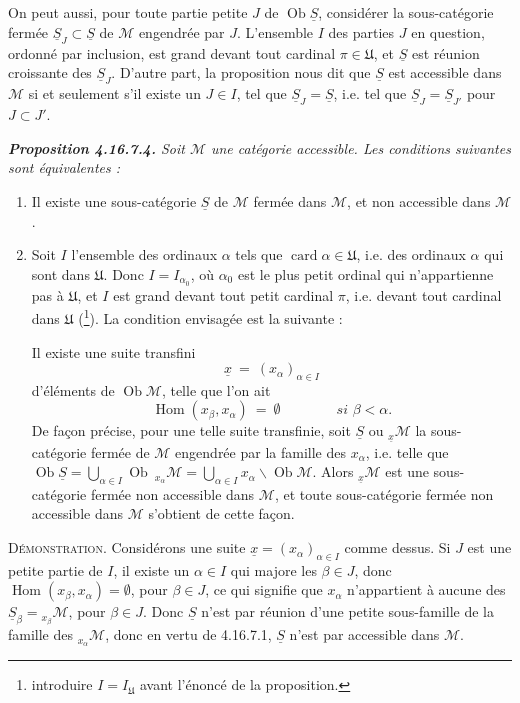 \documentclass[11pt]{article}
\newcommand{\printedpage}[1]{\marginpar{\footnotesize p.~#1}}
\newcommand{\msp}[1]{\marginpar{\footnotesize [#1]}}
\newcommand{\Ob}{\operatorname{Ob}}
\newcommand{\Hom}{\operatorname{Hom}}
\newcommand{\card}{\operatorname{card}}
\newcommand{\cM}{\mathcal{M}}
\newcommand{\uS}{\underline{S}}
\newcommand{\U}{\mathfrak{U}}
\begin{document}
\printedpage{186}

On peut aussi, pour toute partie petite $J$ de $\Ob \uS$, considérer la sous-catégorie fermée $\uS_J \subset \uS$ de $\cM$ engendrée par $J$. L'ensemble $I$ des parties $J$ en question, ordonné par inclusion, est grand devant tout cardinal $\pi \in \U$, et $\uS$ est réunion croissante des $\uS_J$. D'autre part, la proposition nous dit que $\uS$ est accessible dans $\cM$ si et seulement s'il existe un $J \in I$, tel que $\uS_J = \uS$, i.e. tel que $\uS_J = \uS_{J'}$ pour $J \subset J'$.

\begingroup\itshape
\noindent\textbf{\upshape Proposition 4.16.7.4.} Soit $\cM$ une catégorie accessible. Les conditions suivantes sont équivalentes :
\begin{enumerate}[label={}]
\item[a)] Il existe une sous-catégorie $\uS$ de $\cM$ fermée dans $\cM$, et non accessible dans $\cM$.
\item[b)] Soit $I$ l'ensemble des ordinaux $\alpha$ tels que $\card \alpha \in \U$, i.e. des
\msp{page 481}
ordinaux $\alpha$ qui sont dans $\U$. Donc $I = I_{\alpha_0}$, où $\alpha_0$ est le plus petit ordinal qui n'appartienne pas à $\U$, et $I$ est grand devant tout petit cardinal $\pi$, i.e. devant tout cardinal dans $\U$ \textup{(}\footnote{introduire $I = I_{\U}$ avant l'énoncé de la proposition.}\textup{)}. La condition envisagée est la suivante :

Il existe une suite transfini %
\[
\underline{x} \ =\ (x_\alpha)_{\alpha\in I}
\]
d'éléments de $\Ob \cM$, telle que l'on ait
\[
\Hom(x_\beta, x_\alpha) \ =\ \emptyset \qquad\qquad \textit{si } \beta < \alpha.
\]
De façon précise, pour une telle suite transfinie, soit $\uS$ ou ${}_{\underline{x}}\cM$ la sous-catégorie fermée de $\cM$ engendrée par la famille des $x_\alpha$, i.e. telle que $\Ob \uS = \bigcup_{\alpha\in I} \Ob\ {}_{x_\alpha}\cM = \bigcup_{\alpha\in I} x_\alpha\backslash\Ob \cM$. Alors ${}_{\underline{x}}\cM$ est une sous-catégorie fermée non accessible dans $\cM$, et toute sous-catégorie fermée non accessible dans $\cM$ s'obtient de cette façon.
\end{enumerate}
\endgroup

\textsc{Démonstration}. Considérons une suite $\underline{x} = (x_\alpha)_{\alpha\in I}$ comme dessus. Si $J$ est une petite partie de $I$, il existe un $\alpha \in I$ qui majore les $\beta \in J$, donc $\Hom(x_\beta, x_\alpha) = \emptyset$, pour $\beta \in J$,
\msp{page 482}
ce qui signifie que $x_\alpha$ n'appartient à aucune des $\uS_\beta = {}_{x_\beta}\cM$, pour $\beta \in J$. Donc $\uS$ n'est par réunion d'une petite sous-famille de la famille des ${}_{x_\alpha}\cM$, donc en vertu de 4.16.7.1, $\uS$ n'est par accessible dans $\cM$. %
\end{document}
